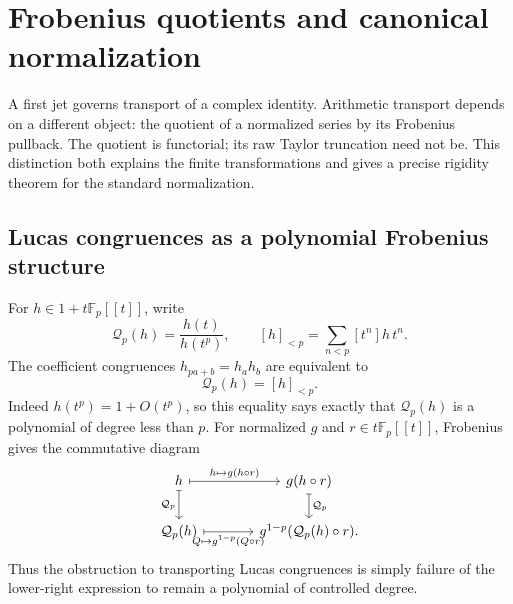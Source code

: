 \section{Frobenius quotients and canonical normalization}
\label{rev:truncations}\label{sec:general-pullbacks}

A first jet governs transport of a complex identity. Arithmetic
transport depends on a different object: the quotient of a normalized
series by its Frobenius pullback. The quotient is functorial; its raw
Taylor truncation need not be. This distinction both explains the
finite transformations and gives a precise rigidity theorem for the
standard normalization.

\subsection{Lucas congruences as a polynomial Frobenius structure}
\label{subsec:C-canonical-lucas}
For $h\in1+t\mathbb F_p[[t]]$, write
\[
 \mathcal Q_p(h)=\frac{h(t)}{h(t^p)},\qquad
 [h]_{<p}=\sum_{n<p}[t^n]h\,t^n.
\]
The coefficient congruences $h_{pa+b}=h_ah_b$ are equivalent to
\begin{equation}\label{rev:eq:lucas-quotient}
 \mathcal Q_p(h)=[h]_{<p}.
\end{equation}
Indeed $h(t^p)=1+O(t^p)$, so this equality says exactly that
$\mathcal Q_p(h)$ is a polynomial of degree less than $p$.
For normalized $g$ and $r\in t\mathbb F_p[[t]]$, Frobenius gives
the commutative diagram
\[
\begin{tikzcd}[column sep=large]
 h \arrow[r,mapsto,"h\mapsto g(h\circ r)"]
   \arrow[d,mapsto,"\mathcal Q_p"']
 &g(h\circ r)\arrow[d,mapsto,"\mathcal Q_p"]\\
 \mathcal Q_p(h)\arrow[r,mapsto,"Q\mapsto g^{1-p}(Q\circ r)"']
 &g^{1-p}(\mathcal Q_p(h)\circ r).
\end{tikzcd}
\]
Thus the obstruction to transporting Lucas congruences is simply
failure of the lower-right expression to remain a polynomial of
controlled degree.

